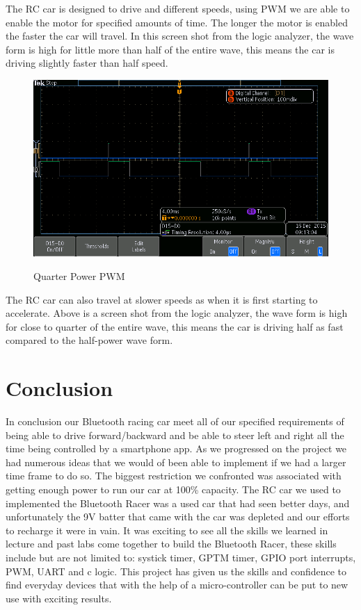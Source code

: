 \documentclass[12pt]{article}
\begin{document}
The RC car is designed to drive and different speeds, using PWM we are able to enable the motor for specified amounts of  time. The longer the motor is enabled the faster the car will travel. In this screen shot from the logic analyzer, the wave form is high for little more than half of the entire wave, this means the car is driving slightly faster than half speed.\\


\begin{figure}[H]
\begin {center}
\includegraphics[scale=.75]{quarter-power}\\
\caption{Quarter Power PWM}
\end {center}
\end{figure}

The RC car can also travel at slower speeds as when it is first starting to accelerate. Above is a screen shot from the logic analyzer, the wave form is high for close to quarter of the entire wave, this means the car is driving half as fast compared to the half-power wave form.\\

\section{Conclusion}
In conclusion our Bluetooth racing car meet all of our specified requirements of being able to drive forward/backward and be able to steer left and right all the time being controlled by a smartphone app. As we progressed on the project we had numerous ideas that we would of been able to implement if we had a larger time frame to do so. The biggest restriction we confronted was associated with getting enough power to run our car at 100\% capacity. The RC car we used to implemented the Bluetooth Racer was a used car that had seen better days, and unfortunately the 9V batter that came with the car was depleted and our efforts to recharge it were in vain. It was exciting to see all the skills we learned in lecture and past labs come together to build the Bluetooth Racer, these skills include but are not limited to: systick timer, GPTM timer, GPIO port interrupts, PWM, UART and c logic. This project has given us the skills and confidence to find everyday devices that with the help of a micro-controller can be put to new use with exciting results.\\
\end{document}
